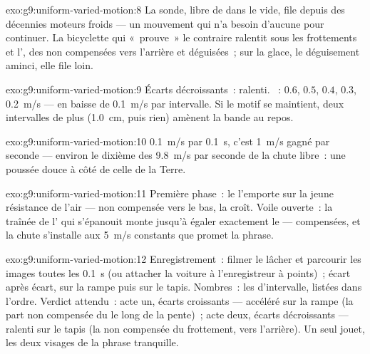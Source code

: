 \begin{solution}{exo:g9:uniform-varied-motion:8}
La sonde, libre de  dans le vide, file depuis des décennies
moteurs froids --- un mouvement qui n'a besoin d'aucune  pour
continuer. La bicyclette qui «~prouve~» le contraire ralentit sous les
frottements et l', des  non compensées vers l'arrière et
déguisées~; sur la glace, le déguisement aminci, elle file loin.
\end{solution}

\begin{solution}{exo:g9:uniform-varied-motion:9}
Écarts décroissants~: ralenti. ~: $0.6$, $0.5$, $0.4$, $0.3$,
\qty{0.2}{m/s} --- en baisse de \qty{0.1}{m/s} par intervalle. Si le
motif se maintient, deux intervalles de plus (\qty{1.0}{cm}, puis
rien) amènent la bande au repos.
\end{solution}

\begin{solution}{exo:g9:uniform-varied-motion:10}
\qty{0.1}{m/s} par \qty{0.1}{s}, c'est \qty{1}{m/s} gagné par seconde
--- environ le dixième des \qty{9.8}{m/s} par seconde de la chute
libre~: une poussée douce à côté de celle de la Terre.
\end{solution}

\begin{solution}{exo:g9:uniform-varied-motion:11}
Première phase~: le  l'emporte sur la jeune résistance de l'air
---  non compensée vers le bas, la  croît. Voile ouverte~:
la traînée de l' qui s'épanouit monte jusqu'à égaler exactement le
 ---  compensées, et la chute s'installe aux \qty{5}{m/s}
constants que promet la phrase.
\end{solution}

\begin{solution}{exo:g9:uniform-varied-motion:12}
Enregistrement~: filmer le lâcher et parcourir les images toutes les
\qty{0.1}{s} (ou attacher la voiture à l'enregistreur à points)~;
 écart après écart, sur la rampe puis sur le tapis. Nombres~:
les  d'intervalle, listées dans l'ordre. Verdict attendu~:
acte un, écarts croissants --- accéléré sur la rampe (la part non
compensée du  le long de la pente)~; acte deux, écarts
décroissants --- ralenti sur le tapis (la  non compensée du
frottement, vers l'arrière). Un seul jouet, les deux visages de la
phrase tranquille.
\end{solution}

